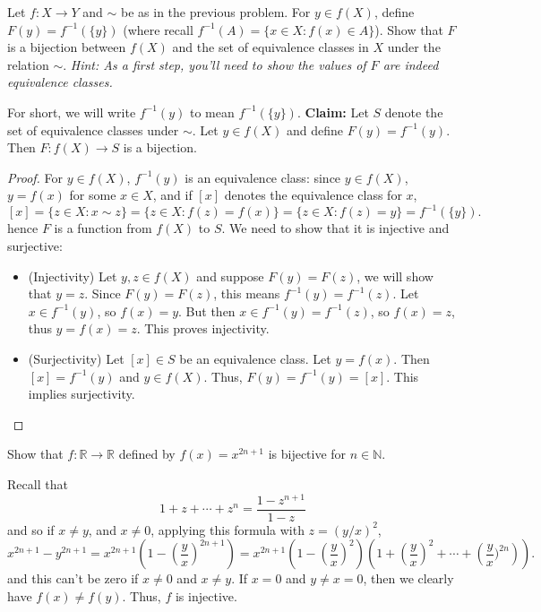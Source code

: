 \documentclass[11pt,dvipsnames]{book}
\numberwithin{equation}{section} %
\numberwithin{figure}{section} %
\numberwithin{table}{section} %
\begin{document}
\begin{exercise}  Let $f:X\rightarrow Y$ and $\sim$ be as in the previous problem.  For $y\in f(X)$, define  $F(y)=f^{-1}(\{y\})$ (where recall $f^{-1}(A)=\{x\in X: f(x)\in A\}$).  Show that $F$ is a bijection between $f(X)$ and the set of equivalence classes in $X$ under the relation $\sim$. {\it Hint: 
As a first step, you'll need to show the values of $F$ are indeed equivalence classes. }



\begin{solution}

For short, we will write $f^{-1}(y)$ to mean $f^{-1}(\{y\})$. 
{\bf Claim:} Let $S$ denote the set of equivalence classes under $\sim$. Let $y\in f(X)$ and define  $F(y)=f^{-1}(y)$. Then $F:f(X)\rightarrow S$ is a bijection. 


\begin{proof}
For $y\in f(X)$, $f^{-1}(y)$ is an equivalence class: since $y\in f(X)$, $y=f(x)$ for some $x\in X$, and if $[x]$ denotes the equivalence class for $x$,
\[
[x]=\{z\in X:x\sim z\} = \{z\in X:f(z)=f(x)\}
= \{z\in X:f(z)=y\}
 =f^{-1}(\{y\}).
 \]
hence $F$ is a function from $f(X)$ to $S$. We need to show that it is injective and surjective:

\begin{itemize}
\item (Injectivity) Let $y,z\in f(X)$ and suppose $F(y)=F(z)$, we will show that $y=z$. Since $F(y)=F(z)$, this means $f^{-1}(y)=f^{-1}(z)$. Let $x\in f^{-1}(y)$, so $f(x)=y$. But then $x\in f^{-1}(y)=f^{-1}(z)$, so $f(x)=z$, thus $y=f(x)=z$. This proves injectivity. 
\item (Surjectivity) Let $[x]\in S$ be an equivalence class. Let $y=f(x)$. Then $[x]=f^{-1}(y)$ and $y\in f(X)$. Thus, $F(y)=f^{-1}(y)=[x]$. This implies surjectivity. 
\end{itemize} 
\end{proof}





\end{solution}
\end{exercise}




\begin{exercise} Show that $f:\mathbb{R}\rightarrow \mathbb{R}$ defined by $f(x)=x^{2n+1}$ is bijective for $n\in\mathbb{N}$. 

\begin{solution}
Recall that 
\[
1+z+\cdots + z^{n} = \frac{1-z^{n+1}}{1-z}
\]
and so if $x\neq y$, and $x\neq 0$, applying this formula with $z=(y/x)^2$,
\[
x^{2n+1} - y^{2n+1} = x^{2n+1} \left(1-\left(\frac{y}{x}\right)^{2n+1}\right)
= x^{2n+1} \left(1-\left(\frac{y}{x}\right)^2\right)\left(1+\left(\frac{y}{x}\right)^2+\cdots + \left(\frac{y}{x})^{2n}\right)\right).
\]
and this can't be zero if $x\neq 0$ and $x\neq y$. If $x=0$ and $y\neq x=0$, then we clearly have $f(x)\neq f(y)$. Thus, $f$ is injective.
\end{solution}


\end{exercise}
\end{document}
